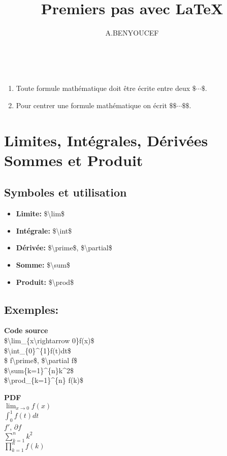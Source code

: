 \documentclass[a4paper,12pt]{article}
\begin{document}
\author{A.BENYOUCEF}
\title{Premiers pas avec \LaTeX}
\begin{center}
\end{center}
\\
\begin{enumerate}	
\item Toute formule math\'ematique doit \^etre \'ecrite entre deux $\$\cdots \$$.
\item Pour centrer une formule math\'ematique on \'ecrit $\$\$\cdots\$\$$.
\end{enumerate}
\section{Limites, Int\'egrales, D\'eriv\'ees Sommes et Produit}
\subsection{Symboles et utilisation}
\begin{itemize}
\item\textbf{Limite:} \$\textbackslash lim\$
\item\textbf{Int\'egrale:} \$\textbackslash int\$
\item \textbf{D\'eriv\'ee:} \$\textbackslash prime\$, \$\textbackslash partial\$
\item\textbf{Somme:} \$\textbackslash sum\$
\item \textbf{Produit:} \$\textbackslash prod\$
\end{itemize}
\subsection{Exemples:}
\begin{minipage}[t]{8cm}	
\textbf{Code source}\\
\$\textbackslash lim\_\{x\textbackslash rightarrow 0\}f(x)\$\\
\$\textbackslash int\_\{0\}\textasciicircum\{1\}f(t)dt\$\\
\$ f\textbackslash prime\$, \$\textbackslash partial f\$\\
\$\textbackslash sum\{k=1\}\textasciicircum\{n\}k\textasciicircum2\$\\
\$\textbackslash prod\_\{k=1\}\textasciicircum\{n\} f(k)\$
\end{minipage}
\hspace{0.3cm}
\begin{minipage}[t]{8cm}
\textbf{PDF}\\
$\lim_{x\rightarrow 0}f(x)$\\
$\int_{0}^{1}f(t)dt$\\
$f\prime$, $\partial f$\\
$\sum_{k=1}^{n}k^2$\\
$\prod_{k=1}^{n} f(k)$
\end{minipage}	
\end{document}
